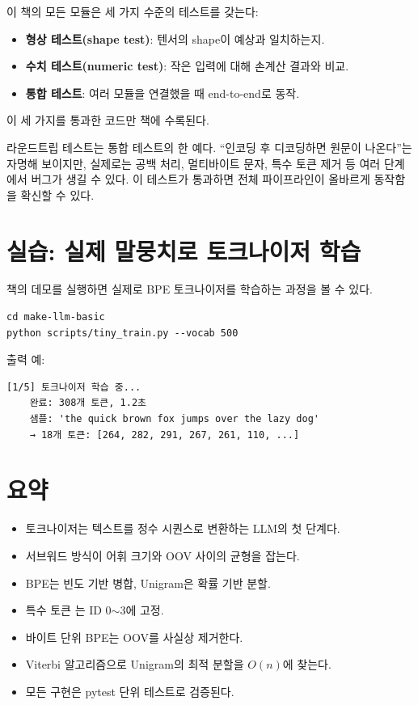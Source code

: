 \begin{notebox}[테스트 철학]
이 책의 모든 모듈은 세 가지 수준의 테스트를 갖는다:
\begin{itemize}
  \item \textbf{형상 테스트(shape test)}: 텐서의 shape이 예상과 일치하는지.
  \item \textbf{수치 테스트(numeric test)}: 작은 입력에 대해 손계산 결과와 비교.
  \item \textbf{통합 테스트}: 여러 모듈을 연결했을 때 end-to-end로 동작.
\end{itemize}
이 세 가지를 통과한 코드만 책에 수록된다.

라운드트립 테스트는 통합 테스트의 한 예다. ``인코딩 후 디코딩하면 원문이 나온다''는 자명해 보이지만, 실제로는 공백 처리, 멀티바이트 문자, 특수 토큰 제거 등 여러 단계에서 버그가 생길 수 있다. 이 테스트가 통과하면 전체 파이프라인이 올바르게 동작함을 확신할 수 있다.
\end{notebox}

\section{실습: 실제 말뭉치로 토크나이저 학습}

책의  데모를 실행하면 실제로 BPE 토크나이저를 학습하는 과정을 볼 수 있다.

\begin{lstlisting}[style=bashstyle]
cd make-llm-basic
python scripts/tiny_train.py --vocab 500
\end{lstlisting}

출력 예:
\begin{lstlisting}[basicstyle=\ttfamily\footnotesize, backgroundcolor=\color{codebg}, frame=single]
[1/5] 토크나이저 학습 중...
    완료: 308개 토큰, 1.2초
    샘플: 'the quick brown fox jumps over the lazy dog'
    → 18개 토큰: [264, 282, 291, 267, 261, 110, ...]
\end{lstlisting}

\section{요약}

\begin{itemize}
  \item 토크나이저는 텍스트를 정수 시퀀스로 변환하는 LLM의 첫 단계다.
  \item 서브워드 방식이 어휘 크기와 OOV 사이의 균형을 잡는다.
  \item BPE는 빈도 기반 병합, Unigram은 확률 기반 분할.
  \item 특수 토큰 는 ID 0$\sim$3에 고정.
  \item 바이트 단위 BPE는 OOV를 사실상 제거한다.
  \item Viterbi 알고리즘으로 Unigram의 최적 분할을 $O(n)$에 찾는다.
  \item 모든 구현은 pytest 단위 테스트로 검증된다.
\end{itemize}

